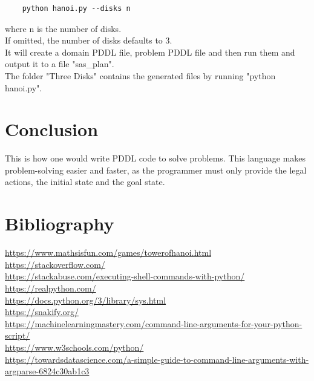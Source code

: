 \documentclass{article}
\begin{document}
\begin{lstlisting}
    python hanoi.py --disks n
\end{lstlisting}

\noindent
where n is the number of disks.\\

\noindent
If omitted, the number of disks defaults to 3.\\

\noindent
It will create a domain PDDL file, problem PDDL file and then run them and output it to a file "sas\_plan".\\

\noindent
The folder "Three Disks" contains the generated files by running "python hanoi.py".

\section{Conclusion}
This is how one would write PDDL code to solve problems. This language makes problem-solving easier and faster, as the programmer must only provide the legal actions, the initial state and the goal state.

\section{Bibliography}
\href{https://www.mathsisfun.com/games/towerofhanoi.html}{https://www.mathsisfun.com/games/towerofhanoi.html}\\
\href{https://stackoverflow.com/}{https://stackoverflow.com/}\\
\href{https://stackabuse.com/executing-shell-commands-with-python/}{https://stackabuse.com/executing-shell-commands-with-python/}\\
\href{https://realpython.com/}{https://realpython.com/}\\
\href{https://docs.python.org/3/library/sys.html}{https://docs.python.org/3/library/sys.html}\\
\href{https://snakify.org/}{https://snakify.org/}\\
\href{https://machinelearningmastery.com/command-line-arguments-for-your-python-script/}{https://machinelearningmastery.com/command-line-arguments-for-your-python-script/}\\
\href{https://www.w3schools.com/python/}{https://www.w3schools.com/python/}\\
\href{https://towardsdatascience.com/a-simple-guide-to-command-line-arguments-with-argparse-6824c30ab1c3}{https://towardsdatascience.com/a-simple-guide-to-command-line-arguments-with-argparse-6824c30ab1c3}
\end{document}
